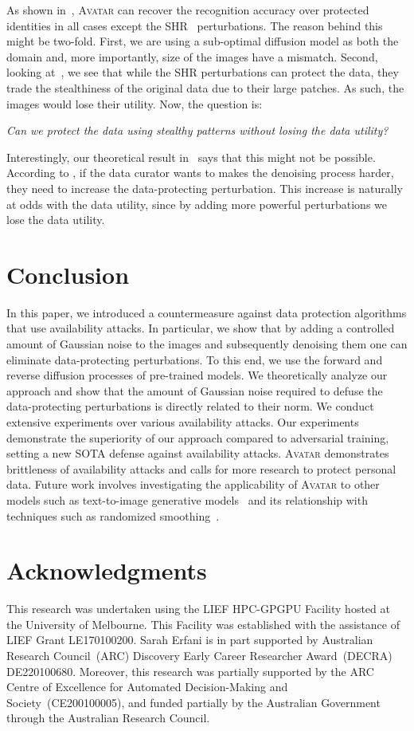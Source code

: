 \documentclass[conference]{IEEEtran}
\theoremstyle{definition}
\theoremstyle{remark}
\theoremstyle{proposition}
\begin{document}
As shown in~, \textsc{Avatar} can recover the recognition accuracy over protected identities in all cases except the SHR~\citep{yu2022shr} perturbations.
The reason behind this might be two-fold.
First, we are using a sub-optimal diffusion model as both the domain and, more importantly, size of the images have a mismatch.
Second, looking at~, we see that while the SHR perturbations can protect the data, they trade the stealthiness of the original data due to their large patches.
As such, the images would lose their utility.
Now, the question is: 
\begin{center}
    \textit{Can we protect the data using stealthy patterns without losing the data utility?}
\end{center}
Interestingly, our theoretical result in~ says that this might not be possible.
According to , if the data curator wants to makes the denoising process harder, they need to increase the data-protecting perturbation.
This increase is naturally at odds with the data utility, since by adding more powerful perturbations we lose the data utility.

\section{Conclusion}\label{sec:conclusion}
In this paper, we introduced a countermeasure against data protection algorithms that use availability attacks.
In particular, we show that by adding a controlled amount of Gaussian noise to the images and subsequently denoising them one can eliminate data-protecting perturbations.
To this end, we use the forward and reverse diffusion processes of pre-trained models.
We theoretically analyze our approach and show that the amount of Gaussian noise required to defuse the data-protecting perturbations is directly related to their norm.
We conduct extensive experiments over various availability attacks.
Our experiments demonstrate the superiority of our approach compared to adversarial training, setting a new SOTA defense against availability attacks.
\textsc{Avatar} demonstrates brittleness of availability attacks and calls for more research to protect personal data.
Future work involves investigating the applicability of \textsc{Avatar} to other models such as text-to-image generative models~\citep{shan2023glaze} and its relationship with techniques such as randomized smoothing~\citep{cohen2019randomized}.

\section*{Acknowledgments}
This research was undertaken using the LIEF HPC-GPGPU Facility hosted at the University of Melbourne. 
This Facility was established with the assistance of LIEF Grant LE170100200. 
Sarah Erfani is in part supported by Australian Research Council~(ARC) Discovery Early Career Researcher Award~(DECRA) DE220100680. 
Moreover, this research was partially supported by the ARC Centre of Excellence for Automated Decision-Making and Society~(CE200100005), and funded partially by the Australian Government through the Australian Research Council.
\end{document}
